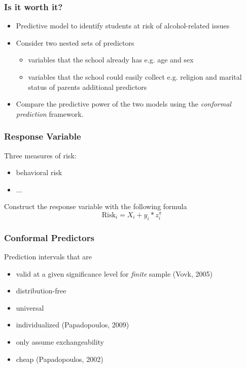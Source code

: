\documentclass{beamer}
\begin{document}
\begin{frame}
  
\end{frame}


\begin{frame} \frametitle{Is it worth it?}


\begin{itemize}
	\item Predictive model to identify students at risk of alcohol-related issues
	\item Consider two nested sets of predictors
	\begin{itemize}
		\item variables that the school already has e.g. age and sex
		\item variables that the school could easily collect e.g. religion and marital status of parents additional predictors
	\end{itemize}
	  \item Compare the predictive power of the two models using the \textit{conformal prediction} framework.
\end{itemize}
\end{frame}


\begin{frame} \frametitle{Response Variable}

Three measures of risk:
\begin{itemize}
	\item behavioral risk
	\item ...
\end{itemize}

Construct the response variable with the following formula
$$\text{Risk}_i = X_i + y_i * z_i ^ \pi$$

\end{frame}


\begin{frame} \frametitle{Conformal Predictors}

Prediction intervals that are
\begin{itemize}
	\item valid at a given significance level for \textit{finite} sample (Vovk, 2005)
	\item distribution-free
	\item universal
	\item individualized (Papadopoulos, 2009)
	\item only assume exchangeability
	\item cheap (Papadopoulos, 2002)
\end{itemize}
\end{frame}
\end{document}
